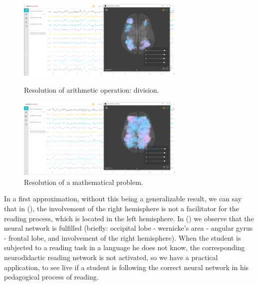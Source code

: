 \documentclass[english]{textolivre}
\begin{document}
\begin{figure}[htbp]
 \centering
 \begin{minipage}{.45\textwidth}
 \includegraphics[width=\textwidth]{Fig10.png}
 \caption{Resolution of arithmetic operation: division.}
 \label{fig10}
 \end{minipage}%
 \qquad
 \begin{minipage}{0.45\textwidth}
 \includegraphics[width=\textwidth]{Fig11.png}
 \caption{Resolution of a mathematical problem.}
 \label{fig11}
 \end{minipage}%
\end{figure}

In a first approximation, without this being a generalizable result, we can say that in (), the involvement of the right hemisphere is not a facilitator for the reading process, which is located in the left hemisphere. In () we observe that the neural network is fulfilled (briefly: occipital lobe - wernicke's area - angular gyrus - frontal lobe, and involvement of the right hemisphere). When the student is subjected to a reading task in a language he does not know, the corresponding neurodidactic reading network is not activated, so we have a practical application, to see live if a student is following the correct neural network in his pedagogical process of reading.
\end{document}
